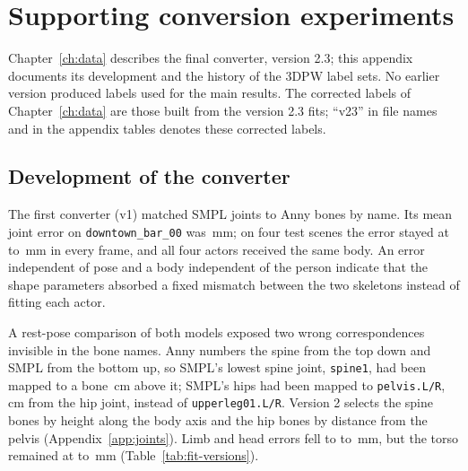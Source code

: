 \chapter{Supporting conversion experiments}
\label{app:conversion}

Chapter~\ref{ch:data} describes the final converter, version 2.3; this appendix documents its development and the
history of the 3DPW label sets. No earlier version produced labels used for the main results. The corrected labels of
Chapter~\ref{ch:data} are those built from the version 2.3 fits; ``v23'' in file names and in the appendix tables
denotes these corrected labels.

\section{Development of the converter}
\label{sec:conversion-history}

The first converter (v1) matched SMPL joints to Anny bones by name. Its mean joint error on
\texttt{downtown\_bar\_00} was \DataVOneBarMean\,mm; on four test scenes the error stayed at \DataVOneFloorMin{} to
\DataVOneFloorMax\,mm in every frame, and all four actors received the same body. An error independent of pose and a
body independent of the person indicate that the shape parameters absorbed a fixed mismatch between the two skeletons
instead of fitting each actor.

A rest-pose comparison of both models exposed two wrong correspondences invisible in the bone names. Anny numbers
the spine from the top down and SMPL from the bottom up, so SMPL's lowest spine joint, \texttt{spine1}, had been mapped
to a bone \DataSpineMapError\,cm above it; SMPL's hips had been mapped to \texttt{pelvis.L/R}, \DataHipMapError\,cm from
the hip joint, instead of \texttt{upperleg01.L/R}. Version 2 selects the spine bones by height along the body axis and
the hip bones by distance from the pelvis (Appendix~\ref{app:joints}). Limb and head errors fell to
\DataVTwoLimbMin{} to \DataVTwoLimbMax\,mm, but the torso remained at \DataVTwoTorsoMin{} to \DataVTwoTorsoMax\,mm
(Table~\ref{tab:fit-versions}).

